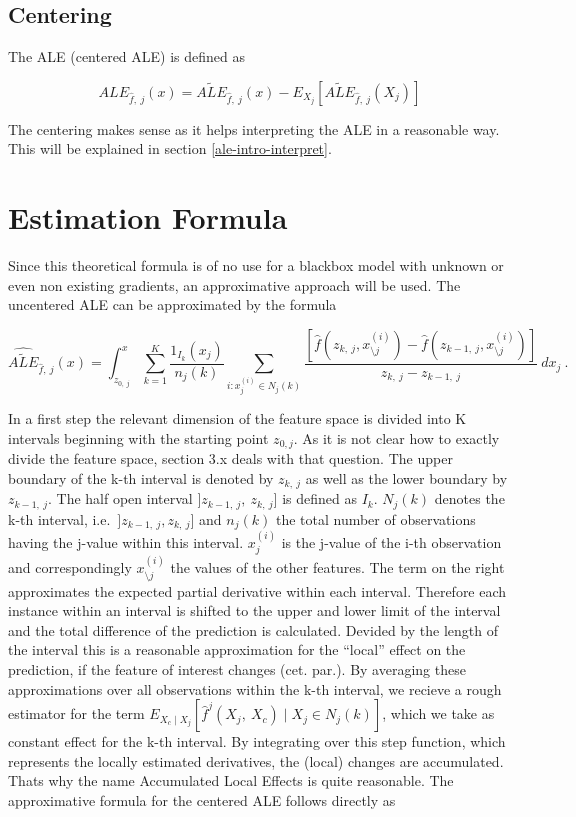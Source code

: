\documentclass[
]{krantz}
\begin{document}
\hypertarget{centering}{%
\subsection{Centering}\label{centering}}

The ALE (centered ALE) is defined as

\[  ALE_{\hat{f},~j}(x) = \widetilde{ALE}_{\hat{f},~j}(x) - E_{X_j}[\widetilde{ALE}_{\hat{f},~j}(X_j)]\]

The centering makes sense as it helps interpreting the ALE in a reasonable way. This will be explained in section \ref{ale-intro-interpret}.

\hypertarget{estimation-formula}{%
\section{Estimation Formula}\label{estimation-formula}}

Since this theoretical formula is of no use for a blackbox model with unknown or even non existing gradients, an approximative approach will be used.
The uncentered ALE can be approximated by the formula

\[ \widehat{\widetilde{ALE}}_{\hat{f},~j}(x) = \int_{z_{0,~j}}^{x} \sum_{k=1}^{K}    \frac{1_{I_k}(x_j)}{n_j(k)}\sum_{i:x_j^{(i)}\in N_j(k)} \frac{[\hat{f}(z_{k,~j}, x_{\setminus j}^{(i)})-\hat{f}(z_{k-1,~j}, x_{\setminus j}^{(i)})]}{z_{k,~j}-z_{k-1,~j}}~dx_j~.  \]

In a first step the relevant dimension of the feature space is divided into K intervals beginning with the starting point \(z_{0, j}\). As it is not clear how to exactly divide the feature space, section 3.x deals with that question. The upper boundary of the k-th interval is denoted by \(z_{k, ~j}\) as well as the lower boundary by \(z_{k-1, ~j}\). The half open interval \(]z_{k-1,~j},~z_{k,~j}]\) is defined as \(I_k\). \(N_j(k)\) denotes the k-th interval, i.e.~\(]z_{k-1,~j}, z_{k,~j}]\) and \(n_j(k)\) the total number of observations having the j-value within this interval. \(x_j^{(i)}\) is the j-value of the i-th observation and correspondingly \(x_{\setminus j}^{(i)}\) the values of the other features. The term on the right approximates the expected partial derivative within each interval.
Therefore each instance within an interval is shifted to the upper and lower limit of the interval and the total difference of the prediction is calculated. Devided by the length of the interval this is a reasonable approximation for the ``local'' effect on the prediction, if the feature of interest changes (cet. par.).
By averaging these approximations over all observations within the k-th interval, we recieve a rough estimator for the term \(E_{X_c \mid X_j} [\hat{f}^j(X_j,~X_c)\mid X_j \in N_j(k)]\), which we take as constant effect for the k-th interval.
By integrating over this step function, which represents the locally estimated derivatives, the (local) changes are accumulated. Thats why the name Accumulated Local Effects is quite reasonable.
The approximative formula for the centered ALE follows directly as
\end{document}
